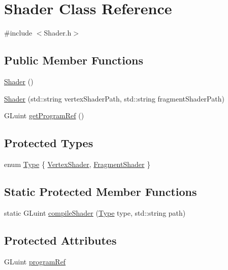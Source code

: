 \hypertarget{class_shader}{}\section{Shader Class Reference}
\label{class_shader}


{\ttfamily \#include $<$Shader.\+h$>$}

\subsection*{Public Member Functions}
\begin{DoxyCompactItemize}
\item 
\hyperlink{class_shader_a0d654ebaca4e0555197c0724c6d30610}{Shader} ()
\item 
\hyperlink{class_shader_a9176ebab5432933a04212973338cbbbb}{Shader} (std\+::string vertex\+Shader\+Path, std\+::string fragment\+Shader\+Path)
\item 
G\+Luint \hyperlink{class_shader_a7b5d15634abef2671085a38b73e86e58}{get\+Program\+Ref} ()
\end{DoxyCompactItemize}
\subsection*{Protected Types}
\begin{DoxyCompactItemize}
\item 
enum \hyperlink{class_shader_abdbec99e399193b12d229d51566323fd}{Type} \{ \hyperlink{class_shader_abdbec99e399193b12d229d51566323fdada97e96eb0013c1ab78a9fc843869daa}{Vertex\+Shader}, 
\hyperlink{class_shader_abdbec99e399193b12d229d51566323fda482dd8ff1d0dcce735a602aaded5253d}{Fragment\+Shader}
 \}
\end{DoxyCompactItemize}
\subsection*{Static Protected Member Functions}
\begin{DoxyCompactItemize}
\item 
static G\+Luint \hyperlink{class_shader_a6a43849889abbbe31c7384929e0d37c4}{compile\+Shader} (\hyperlink{class_shader_abdbec99e399193b12d229d51566323fd}{Type} type, std\+::string path)
\end{DoxyCompactItemize}
\subsection*{Protected Attributes}
\begin{DoxyCompactItemize}
\item 
G\+Luint \hyperlink{class_shader_ac565e02af616d8b73ade58edb2f26ca5}{program\+Ref}
\end{DoxyCompactItemize}


